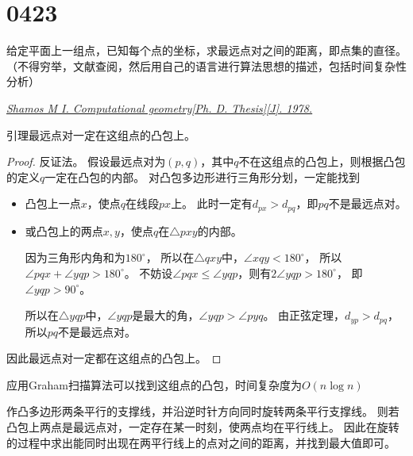 \section{0423}\label{sec:0423}
\begin{questions}

    \question 给定平面上一组点，已知每个点的坐标，求最远点对之间的距离，即点集的直径。
    （不得穷举，文献查阅，然后用自己的语言进行算法思想的描述，包括时间复杂性分析）

    \begin{solution}
        \textit{
            \href{http://euro.ecom.cmu.edu/people/faculty/mshamos/1978ShamosThesis.pdf}
            {Shamos M I. Computational geometry[Ph. D. Thesis][J]. 1978.}
        }

        \textsf{引理\quad}最远点对一定在这组点的凸包上。

        \begin{proof}
            反证法。
            假设最远点对为$(p,q)$，其中$q$不在这组点的凸包上，则根据凸包的定义$q$一定在凸包的内部。
            对凸包多边形进行三角形分划，一定能找到\begin{itemize}
                \item {
                      凸包上一点$x$，使点$q$在线段$px$上。
                      此时一定有$d_{px} > d_{pq}$，即$pq$不是最远点对。
                      }
                \item {
                      或凸包上的两点$x,y$，使点$q$在$\triangle pxy$的内部。

                      因为三角形内角和为$180^\circ$，
                      所以在$\triangle qxy$中，$\angle xqy < 180^\circ$，
                      所以$\angle pqx + \angle yqp > 180^\circ$。
                      不妨设$\angle pqx \le \angle yqp$，则有$2 \angle yqp > 180^\circ$，
                      即$\angle yqp > 90^\circ$。

                      所以在$\triangle yqp$中，$\angle yqp$是最大的角，$\angle yqp > \angle pyq$。
                      由正弦定理，$d_{yp} > d_{pq}$，所以$pq$不是最远点对。
                      }
            \end{itemize}
            因此最远点对一定都在这组点的凸包上。
        \end{proof}
        应用Graham扫描算法可以找到这组点的凸包，时间复杂度为$O(n \log n)$

        作凸多边形两条平行的支撑线，并沿逆时针方向同时旋转两条平行支撑线。
        则若凸包上两点是最远点对，一定存在某一时刻，使两点均在平行线上。
        因此在旋转的过程中求出能同时出现在两平行线上的点对之间的距离，并找到最大值即可。


\end{solution}
\end{questions}
